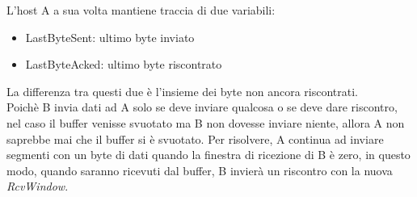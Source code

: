 \documentclass[11pt,a4paper]{book}
\begin{document}
L'host A a sua volta mantiene traccia di due variabili:
\begin{itemize}
	\item LastByteSent: ultimo byte inviato
	\item LastByteAcked: ultimo byte riscontrato
\end{itemize}
La differenza tra questi due è l'insieme dei byte non ancora riscontrati. \\
Poichè B invia dati ad A solo se deve inviare qualcosa o se deve dare riscontro, nel caso il buffer venisse svuotato ma B non dovesse inviare niente, allora A non saprebbe mai che il buffer si è svuotato. Per risolvere, A continua ad inviare segmenti con un byte di dati quando la finestra di ricezione di B è zero, in questo modo, quando saranno ricevuti dal buffer, B invierà un riscontro con la nuova \emph{RcvWindow}.
\end{document}
